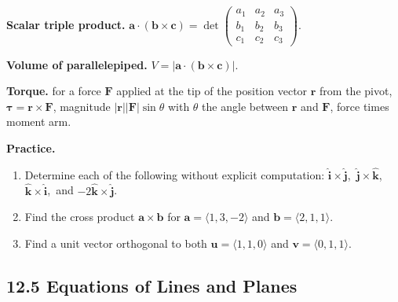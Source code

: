 \documentclass[12pt]{article}
\theoremstyle{compact}
\renewcommand{\vec}[1]{\mathbf{#1}}
\newcommand{\ihat}{\hat{\mathbf{i}}}
\newcommand{\jhat}{\hat{\mathbf{j}}}
\newcommand{\khat}{\hat{\mathbf{k}}}
\begin{document}
\begin{center}
\end{center}

\textbf{Scalar triple product.} $\vec{a}\cdot(\vec{b}\times\vec{c}) = \det\begin{pmatrix}a_1&a_2&a_3\\b_1&b_2&b_3\\c_1&c_2&c_3\end{pmatrix}$.

\textbf{Volume of parallelepiped.} $V = |\vec{a}\cdot(\vec{b}\times\vec{c})|$.

\textbf{Torque.} for a force $\vec F$ applied at the tip of the position vector $\vec r$ from the pivot, $\vec{\tau} = \vec{r}\times\vec{F}$, magnitude $|\vec r||\vec F|\sin\theta$ with $\theta$ the angle between $\vec r$ and $\vec F$, force times moment arm.

\medskip\textbf{Practice.}
\begin{enumerate}[noitemsep]
  \item Determine each of the following without explicit computation: $\ihat\times\jhat$,\ $\jhat\times\khat$,\ $\khat\times\ihat$,\ and $-2\khat\times\jhat$.
  \item Find the cross product $\vec{a}\times\vec{b}$ for $\vec{a}=\langle 1,3,-2\rangle$ and $\vec{b}=\langle 2,1,1\rangle$.
  \item Find a unit vector orthogonal to both $\vec{u}=\langle 1,1,0\rangle$ and $\vec{v}=\langle 0,1,1\rangle$.
\end{enumerate}

\subsection{12.5 Equations of Lines and Planes}
\end{document}
